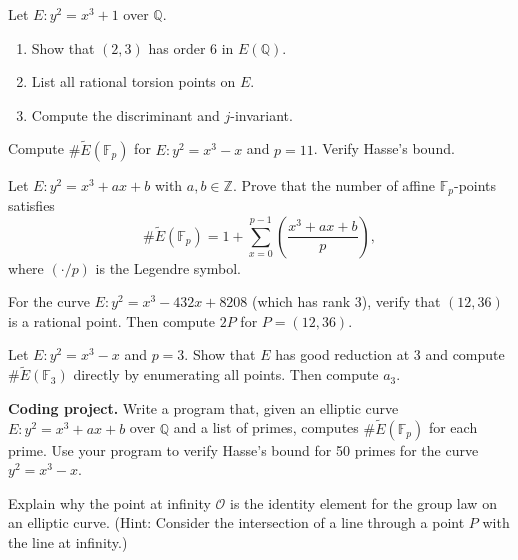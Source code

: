 \begin{exercise}
Let $E: y^2 = x^3 + 1$ over $\mathbb{Q}$.
\begin{enumerate}
\item Show that $(2, 3)$ has order 6 in $E(\mathbb{Q})$.
\item List all rational torsion points on $E$.
\item Compute the discriminant and $j$-invariant.
\end{enumerate}
\end{exercise}

\begin{exercise}
Compute $\#\widetilde{E}(\mathbb{F}_p)$ for $E: y^2 = x^3 - x$ and $p = 11$. Verify Hasse's bound.
\end{exercise}

\begin{exercise}
Let $E: y^2 = x^3 + ax + b$ with $a, b \in \mathbb{Z}$. Prove that the number of affine $\mathbb{F}_p$-points satisfies
\[
\#\widetilde{E}(\mathbb{F}_p) = 1 + \sum_{x=0}^{p-1} \left(\frac{x^3 + ax + b}{p}\right),
\]
where $(\cdot/p)$ is the Legendre symbol.
\end{exercise}

\begin{exercise}
For the curve $E: y^2 = x^3 - 432x + 8208$ (which has rank 3), verify that $(12, 36)$ is a rational point. Then compute $2P$ for $P = (12, 36)$.
\end{exercise}

\begin{exercise}
Let $E: y^2 = x^3 - x$ and $p = 3$. Show that $E$ has good reduction at 3 and compute $\#\widetilde{E}(\mathbb{F}_3)$ directly by enumerating all points. Then compute $a_3$.
\end{exercise}

\begin{exercise}
\textbf{Coding project.} Write a program that, given an elliptic curve $E: y^2 = x^3 + ax + b$ over $\mathbb{Q}$ and a list of primes, computes $\#\widetilde{E}(\mathbb{F}_p)$ for each prime. Use your program to verify Hasse's bound for 50 primes for the curve $y^2 = x^3 - x$.
\end{exercise}

\begin{exercise}
Explain why the point at infinity $\mathcal{O}$ is the identity element for the group law on an elliptic curve. (Hint: Consider the intersection of a line through a point $P$ with the line at infinity.)
\end{exercise}

